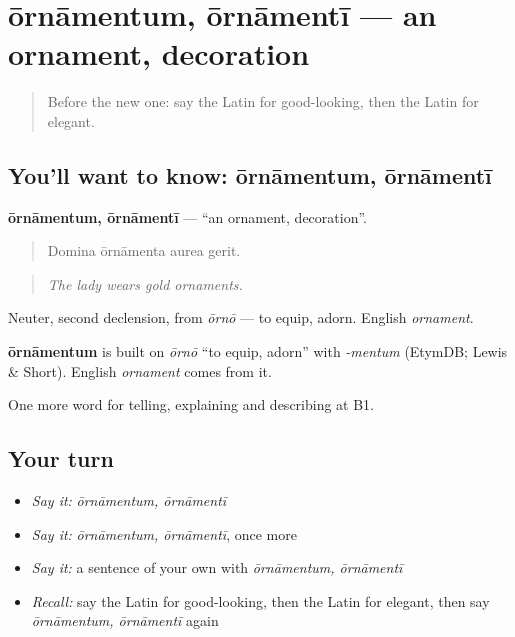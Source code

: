 \section[ōrnāmentum, ōrnāmentī]{ōrnāmentum, ōrnāmentī — an ornament, decoration}

\label{lesson:LA-C548-ornamentum}



\begin{quote}
Before the new one: say the Latin for good-looking, then the Latin for elegant.
\end{quote}

\subsection*{You'll want to know: ōrnāmentum, ōrnāmentī}
\textbf{ōrnāmentum, ōrnāmentī} — \textquotedblleft{}an ornament, decoration\textquotedblright{}.

\begin{quote}
Domina ōrnāmenta aurea gerit.
\end{quote}

\begin{quote}
\emph{The lady wears gold ornaments.}
\end{quote}

Neuter, second declension, from \emph{ōrnō} — to equip, adorn. English \emph{ornament}.

\begin{cousinweb}
\textbf{ōrnāmentum} is built on \emph{ōrnō} \textquotedblleft{}to equip, adorn\textquotedblright{} with \emph{-mentum} (EtymDB; Lewis \& Short). English \emph{ornament} comes from it.
\end{cousinweb}

\begin{grammarlens}[title={What you've built}]
One more word for telling, explaining and describing at B1.
\end{grammarlens}

\subsection*{Your turn}
\begin{itemize}
\raggedright
  \item \emph{Say it:} \emph{ōrnāmentum, ōrnāmentī}
  \item \emph{Say it:} \emph{ōrnāmentum, ōrnāmentī}, once more
  \item \emph{Say it:} a sentence of your own with \emph{ōrnāmentum, ōrnāmentī}
  \item \emph{Recall:} say the Latin for good-looking, then the Latin for elegant, then say \emph{ōrnāmentum, ōrnāmentī} again
\end{itemize}

